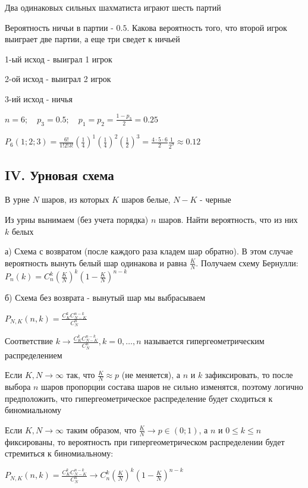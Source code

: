 \documentclass[12pt]{article}
\begin{document}
    \Ex Два одинаковых сильных шахматиста играют шесть партий

    Вероятность ничьи в партии - $0.5$. Какова вероятность того, что второй игрок выиграет две партии, а еще три сведет к ничьей

    1-ый исход - выиграл 1 игрок

    2-ой исход - выиграл 2 игрок

    3-ий исход - ничья

    $n = 6; \quad p_3 = 0.5; \quad p_1 = p_2 = \frac{1 - p_3}{2} = 0.25$

    $P_6(1; 2; 3) = \frac{6!}{1!2!3!} \left(\frac{1}{4}\right)^1 \left(\frac{1}{4}\right)^2 \left(\frac{1}{2}\right)^3 = \frac{4 \cdot 5 \cdot 6}{2} \frac{1}{2^9} \approx 0.12$

    \subsection{IV. Урновая схема}

    В урне $N$ шаров, из которых $K$ шаров белые, $N - K$ - черные

    Из урны вынимаем (без учета порядка) $n$ шаров. Найти вероятность, что из них $k$ белых

    а) Схема с возвратом (после каждого раза кладем шар обратно). В этом случае вероятность вынуть белый шар одинакова и
    равна $\frac{K}{N}$. Получаем схему Бернулли: $P_n(k) = C^k_n \left(\frac{K}{N}\right)^k \left(1 - \frac{K}{N}\right)^{n - k}$

    б) Схема без возврата - вынутый шар мы выбрасываем

    $P_{N, K} (n, k) = \frac{C^k_K C^{n - k}_{N - K}}{C^n_N}$

    \Def Соответствие $k \rightarrow \frac{C^k_K C^{n - k}_{N - K}}{C^n_N}, k = 0, \dots, n$ называется гипергеометрическим
    распределением

    \Nota Если $K, N \to \infty$ так, что $\frac{K}{N} \approx p$ (не меняется), а $n$ и $k$ зафиксировать, то после выбора
    $n$ шаров пропорции состава шаров не сильно изменятся, поэтому логично предположить, что гипергеометрическое распределение
    будет сходиться к биномиальному

    \begin{MyTheorem}
        \Ths Если $K, N \to \infty$ таким образом, что $\frac{K}{N} \to p \in (0;1)$, а $n$ и $0 \leq k \leq n$ фиксированы, то
        вероятность при гипергеометрическом распределении будет стремиться к биномиальному:

        $P_{N,K} (n, k) = \frac{C^k_K C^{n - k}_{N - K}}{C^n_N} \rightarrow C^k_n \left(\frac{K}{N}\right)^k \left(1 - \frac{K}{N}\right)^{n - k}$
    \end{MyTheorem}
\end{document}
